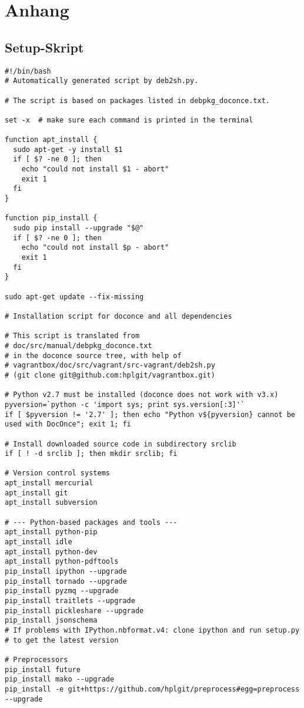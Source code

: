 \documentclass[%
oneside,                 %
final,                   %
chapterprefix=true,      %
open=right,              %
10pt]{book}
\begin{document}
\chapter{Anhang}
\section{Setup-Skript}
\begin{verbatim}
#!/bin/bash
# Automatically generated script by deb2sh.py.

# The script is based on packages listed in debpkg_doconce.txt.

set -x  # make sure each command is printed in the terminal

function apt_install {
  sudo apt-get -y install $1
  if [ $? -ne 0 ]; then
    echo "could not install $1 - abort"
    exit 1
  fi
}

function pip_install {
  sudo pip install --upgrade "$@"
  if [ $? -ne 0 ]; then
    echo "could not install $p - abort"
    exit 1
  fi
}

sudo apt-get update --fix-missing

# Installation script for doconce and all dependencies

# This script is translated from
# doc/src/manual/debpkg_doconce.txt
# in the doconce source tree, with help of
# vagrantbox/doc/src/vagrant/src-vagrant/deb2sh.py
# (git clone git@github.com:hplgit/vagrantbox.git)

# Python v2.7 must be installed (doconce does not work with v3.x)
pyversion=`python -c 'import sys; print sys.version[:3]'`
if [ $pyversion != '2.7' ]; then echo "Python v${pyversion} cannot be used with DocOnce"; exit 1; fi

# Install downloaded source code in subdirectory srclib
if [ ! -d srclib ]; then mkdir srclib; fi

# Version control systems
apt_install mercurial
apt_install git
apt_install subversion

# --- Python-based packages and tools ---
apt_install python-pip
apt_install idle
apt_install python-dev
apt_install python-pdftools
pip_install ipython --upgrade
pip_install tornado --upgrade
pip_install pyzmq --upgrade
pip_install traitlets --upgrade
pip_install pickleshare --upgrade
pip_install jsonschema
# If problems with IPython.nbformat.v4: clone ipython and run setup.py
# to get the latest version

# Preprocessors
pip_install future
pip_install mako --upgrade
pip_install -e git+https://github.com/hplgit/preprocess#egg=preprocess --upgrade


\end{verbatim}
\end{document}
